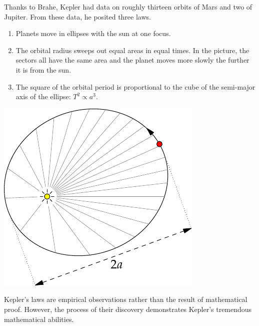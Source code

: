 \begin{minipage}[t]{0.66\linewidth}\vspace{-3pt}
	Thanks to Brahe, Kepler had data on roughly thirteen orbits of Mars and two of Jupiter. From these data, he posited three laws.
	\begin{enumerate}\itemsep0pt
	  \item Planets move in ellipses with the sun at one focus.
		\item The orbital radius sweeps out equal areas in equal times. In the picture, the sectors all have the same area and the planet moves more slowly the further it is from the sun.
		\item The square of the orbital period is proportional to the cube of the semi-major axis of the ellipse: $T^2\propto a^3$.
	\end{enumerate}
\end{minipage}
\hfill
\begin{minipage}[t]{0.32\linewidth}\vspace{-10pt}
	\flushright\includegraphics[scale=0.85]{ren-kepler}
\end{minipage}
\goodbreak


Kepler's laws are empirical observations rather than the result of mathematical proof. However, the process of their discovery demonstrates Kepler's tremendous mathematical abilities.

